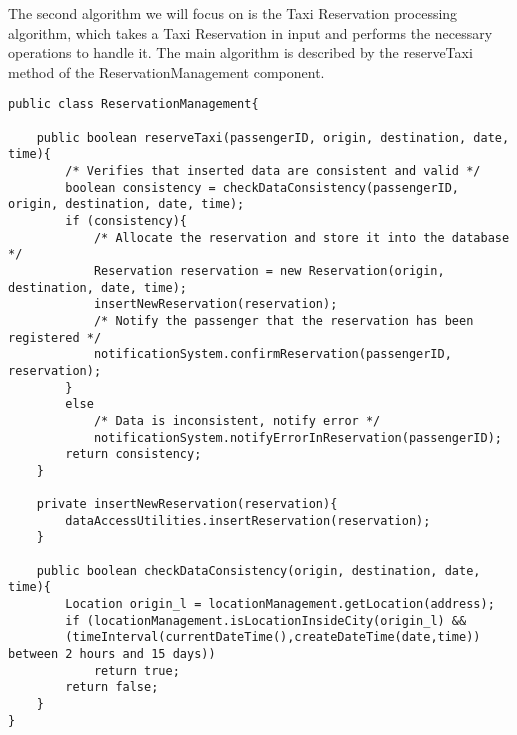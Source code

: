 The second algorithm we will focus on is the Taxi Reservation processing algorithm, which takes a Taxi Reservation in input and performs the necessary operations to handle it. The main algorithm is described by the reserveTaxi method of the ReservationManagement component.

\begin{lstlisting}
public class ReservationManagement{

	public boolean reserveTaxi(passengerID, origin, destination, date, time){
		/* Verifies that inserted data are consistent and valid */
		boolean consistency = checkDataConsistency(passengerID, origin, destination, date, time);
		if (consistency){
			/* Allocate the reservation and store it into the database */
			Reservation reservation = new Reservation(origin, destination, date, time);
			insertNewReservation(reservation);
			/* Notify the passenger that the reservation has been registered */
			notificationSystem.confirmReservation(passengerID, reservation);
		}
		else
			/* Data is inconsistent, notify error */
			notificationSystem.notifyErrorInReservation(passengerID);
		return consistency;
	}
	
	private insertNewReservation(reservation){
		dataAccessUtilities.insertReservation(reservation);
	}
	
	public boolean checkDataConsistency(origin, destination, date, time){
		Location origin_l = locationManagement.getLocation(address);
		if (locationManagement.isLocationInsideCity(origin_l) && 
		(timeInterval(currentDateTime(),createDateTime(date,time)) between 2 hours and 15 days))
			return true;
		return false; 
	}
}	
\end{lstlisting}

